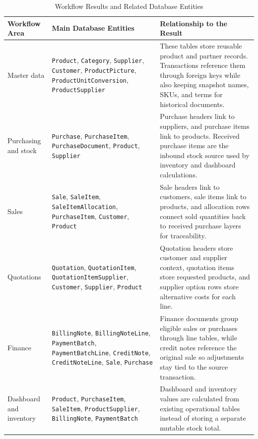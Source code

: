 \begin{table}[!htbp]
	\centering
	\BlackbookTableSetup
	\renewcommand{\arraystretch}{1.3}
	\caption{Workflow Results and Related Database Entities}
	\label{tab:workflow-database-entity-map}
	\begin{tabularx}{\textwidth}{|B{3cm}|B{4.7cm}|Z|}
		\hline
		\textbf{Workflow Area} & \textbf{Main Database Entities} & \textbf{Relationship to the Result} \\ \hline
		Master data & \texttt{Product}, \texttt{Category}, \texttt{Supplier}, \texttt{Customer}, \texttt{ProductPicture}, \texttt{ProductUnitConversion}, \texttt{ProductSupplier} & These tables store reusable product and partner records. Transactions reference them through foreign keys while also keeping snapshot names, SKUs, and terms for historical documents. \\ \hline
		Purchasing and stock & \texttt{Purchase}, \texttt{PurchaseItem}, \texttt{PurchaseDocument}, \texttt{Product}, \texttt{Supplier} & Purchase headers link to suppliers, and purchase items link to products. Received purchase items are the inbound stock source used by inventory and dashboard calculations. \\ \hline
		Sales & \texttt{Sale}, \texttt{SaleItem}, \texttt{SaleItemAllocation}, \texttt{PurchaseItem}, \texttt{Customer}, \texttt{Product} & Sale headers link to customers, sale items link to products, and allocation rows connect sold quantities back to received purchase layers for traceability. \\ \hline
		Quotations & \texttt{Quotation}, \texttt{QuotationItem}, \texttt{QuotationItemSupplier}, \texttt{Customer}, \texttt{Supplier}, \texttt{Product} & Quotation headers store customer and supplier context, quotation items store requested products, and supplier option rows store alternative costs for each line. \\ \hline
		Finance & \texttt{BillingNote}, \texttt{BillingNoteLine}, \texttt{PaymentBatch}, \texttt{PaymentBatchLine}, \texttt{CreditNote}, \texttt{CreditNoteLine}, \texttt{Sale}, \texttt{Purchase} & Finance documents group eligible sales or purchases through line tables, while credit notes reference the original sale so adjustments stay tied to the source transaction. \\ \hline
		Dashboard and inventory & \texttt{Product}, \texttt{PurchaseItem}, \texttt{SaleItem}, \texttt{ProductSupplier}, \texttt{BillingNote}, \texttt{PaymentBatch} & Dashboard and inventory values are calculated from existing operational tables instead of storing a separate mutable stock total. \\ \hline

\end{tabularx}
\end{table}
